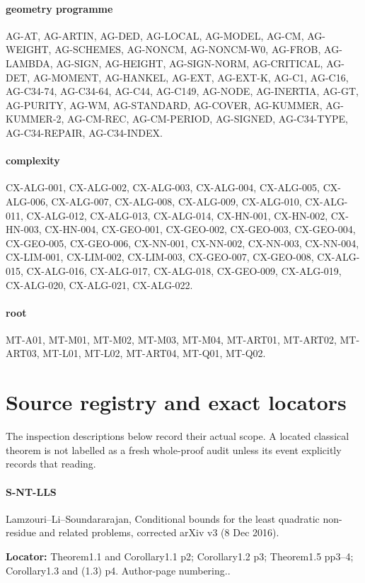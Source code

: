 \documentclass[11pt,a4paper]{article}
\begin{document}
\paragraph{geometry programme} AG-AT, AG-ARTIN, AG-DED, AG-LOCAL, AG-MODEL, AG-CM, AG-WEIGHT, AG-SCHEMES, AG-NONCM, AG-NONCM-W0, AG-FROB, AG-LAMBDA, AG-SIGN, AG-HEIGHT, AG-SIGN-NORM, AG-CRITICAL, AG-DET, AG-MOMENT, AG-HANKEL, AG-EXT, AG-EXT-K, AG-C1, AG-C16, AG-C34-74, AG-C34-64, AG-C44, AG-C149, AG-NODE, AG-INERTIA, AG-GT, AG-PURITY, AG-WM, AG-STANDARD, AG-COVER, AG-KUMMER, AG-KUMMER-2, AG-CM-REC, AG-CM-PERIOD, AG-SIGNED, AG-C34-TYPE, AG-C34-REPAIR, AG-C34-INDEX.
\paragraph{complexity} CX-ALG-001, CX-ALG-002, CX-ALG-003, CX-ALG-004, CX-ALG-005, CX-ALG-006, CX-ALG-007, CX-ALG-008, CX-ALG-009, CX-ALG-010, CX-ALG-011, CX-ALG-012, CX-ALG-013, CX-ALG-014, CX-HN-001, CX-HN-002, CX-HN-003, CX-HN-004, CX-GEO-001, CX-GEO-002, CX-GEO-003, CX-GEO-004, CX-GEO-005, CX-GEO-006, CX-NN-001, CX-NN-002, CX-NN-003, CX-NN-004, CX-LIM-001, CX-LIM-002, CX-LIM-003, CX-GEO-007, CX-GEO-008, CX-ALG-015, CX-ALG-016, CX-ALG-017, CX-ALG-018, CX-GEO-009, CX-ALG-019, CX-ALG-020, CX-ALG-021, CX-ALG-022.
\paragraph{root} MT-A01, MT-M01, MT-M02, MT-M03, MT-M04, MT-ART01, MT-ART02, MT-ART03, MT-L01, MT-L02, MT-ART04, MT-Q01, MT-Q02.
\section*{Source registry and exact locators}
The inspection descriptions below record their actual scope. A located
classical theorem is not labelled as a fresh whole-proof audit unless
its event explicitly records that reading.

\paragraph{S-NT-LLS} Lamzouri–\allowbreak{}Li–\allowbreak{}Soundararajan, Conditional bounds for the least quadratic non-residue and related problems, corrected arXiv v3 (8 Dec 2016).

\textbf{Locator:} Theorem1.\allowbreak{}1 and Corollary1.\allowbreak{}1 p2; Corollary1.\allowbreak{}2 p3; Theorem1.\allowbreak{}5 pp3–\allowbreak{}4; Corollary1.\allowbreak{}3 and (1.\allowbreak{}3) p4.\allowbreak{} Author-page numbering.\allowbreak{}.
\end{document}
